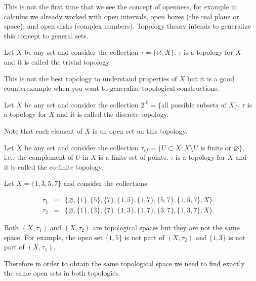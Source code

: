 \documentclass[
	fontsize=10pt, %
	twoside=false, %
	secnumdepth=1, %
]{kaobook}
\begin{document}
This is not the first time that we see the concept of openness, for example in calculus we already worked with open intervals, open boxes (the real plane or space), and open disks (complex numbers). Topology theory intends to generalize this concept to general sets.

\begin{example}
Let $X$ be any set and consider the collection $\tau=\{\varnothing, X\}.$ $\tau$ is a topology for $X$ and it is called the trivial topology. 

This is not the best topology to understand properties of $X$ but it is a good counterexample when you want to generalize topological constructions.
\end{example}

\begin{example}
Let $X$ be any set and consider the collection $2^X=\{\mbox{all possible subsets of } X\}.$ $\tau$ is a topology for $X$ and it is called the discrete topology. 

Note that each element of $X$ is an open set on this topology. 
\end{example}

\begin{example}
Let $X$ be any set and consider the collection $\tau_{cf}=\{U\subset X: X\setminus U \mbox{ is finite or }\varnothing\},$ i.e., the complement of $U$ in $X$ is a finite set of points. $\tau$ is a topology for $X$ and it is called the co-finite topology. 
\end{example}


\begin{example}
Let $X=\{1,3,5,7\}$ and consider the collections

\begin{eqnarray*}
\tau_1 &=& \{\varnothing, \{1\},\{5\},\{7\},\{1,5\},\{1,7\},\{5,7\},\{1,5,7\},X\}. \\
\tau_2 &=& \{\varnothing, \{1\},\{3\},\{7\},\{1,3\},\{1,7\},\{3,7\},\{1,3,7\},X\}.
\end{eqnarray*}

Both $(X,\tau_1)$ and $(X,\tau_2)$ are topological spaces but they are not the same space. For example, the open set $\{1,5\}$ is not part of $(X,\tau_2)$ and $\{1,3\}$  is not part of $(X,\tau_1).$ 

Therefore in order to obtain the same topological space we need to find exactly the same open sets in both topologies.
\end{example}
\end{document}
